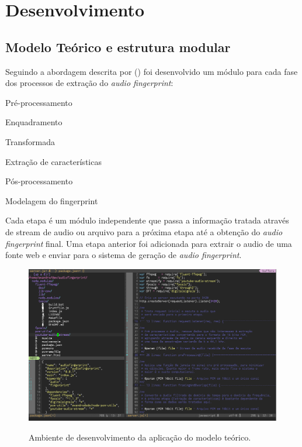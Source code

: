 \chapter{Desenvolvimento}
\label{c.desenvolvimento}

\section{Modelo Teórico e estrutura modular}
\label{s.modeloteorico}

Seguindo a abordagem descrita por  (\citeyear{canoetal05}) foi desenvolvido um módulo para cada fase dos processos de extração do \emph{audio fingerprint}:

\begin{alineas}

\item Pré-processamento
\item Enquadramento
\item Transformada
\item Extração de características
\item Pós-processamento
\item Modelagem do fingerprint

\end{alineas}

Cada etapa é um módulo independente que passa a informação tratada através de stream de audio ou arquivo para a próxima etapa até a obtenção do \emph{audio fingerprint} final. Uma etapa anterior foi adicionada para extrair o audio de uma fonte web e enviar para o sistema de geração de \emph{audio fingerprint}.


\begin{figure}[h]
\caption{\small Ambiente de desenvolvimento da aplicação do modelo teórico.}
\centering
\includegraphics[scale=0.50]{figs/ambientegeral.png}
\label{f.diagrama}
\end{figure}

